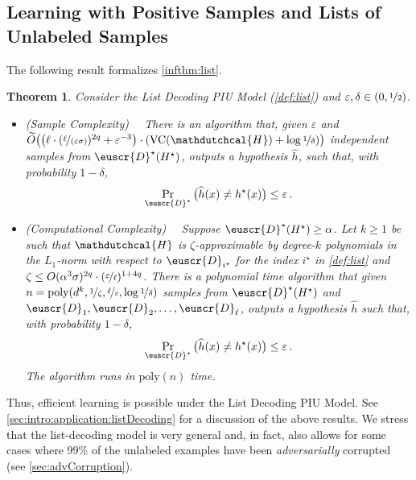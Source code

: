 \documentclass[11pt]{article}
\theoremstyle{plain}
\newtheorem{theorem}{Theorem}[section]
\theoremstyle{definition}
\theoremstyle{remark}
\newcommand{\sinparen}[1]{(#1)}
\newcommand{\binparen}[1]{\big(#1\big)}
\newcommand{\nfrac}[2]{\nicefrac{#1}{#2}}
\newcommand{\poly}{\mathrm{poly}}
\newcommand{\vc}{\textrm{\rm VC}}
\newcommand{\eps}{\varepsilon}
\newcommand{\wh}[1]{\widehat{#1}}
\renewcommand{\tilde}{\widetilde}
\newcommand{\customcal}[1]{\euscr{#1}}
\newcommand{\cD}{\customcal{D}}
\newcommand{\hypo}[1]{\mathdutchcal{#1}}
\newcommand{\hyH}{\hypo{H}}
\newcommand{\cDtrue}{\cD^\star}
\newcommand{\cDgiven}{\cD}
\renewcommand{\tilde}{\widetilde}
\newcommand{\nL}{L}
\begin{document}
        
         
        
    \subsection{Learning with Positive Samples and Lists of Unlabeled Samples}\label{sec:application:listDecoding}
        The following result formalizes \cref{infthm:list}.
        \begin{theorem}\label{thm:listDecoding}
            Consider the List Decoding PIU Model (\cref{def:list}) and $\eps,\delta\in (0,\nfrac{1}{2})$.
            \begin{itemize}
                \item[$\triangleright$] (Sample Complexity)~~ There is an algorithm that, given $\eps$ and 
                $\tilde{O}\binparen{\binparen{\ell\cdot \sinparen{\nfrac{\ell}{(\eps\sigma)}}^{2q} + {\eps^{-3}}}\cdot \sinparen{\vc{(\hyH)} + \log \nfrac{1}{\delta}}}$ independent samples from $\cDtrue(H^\star)$, outputs a hypothesis $\wh{h}$, such that, with probability $1-\delta$,
                \[
                    \Pr_{\cDtrue}\binparen{\wh{h}(x) \neq h^\star(x)} \leq \eps\,.
                \]
                \item[$\triangleright$] (Computational Complexity)~~ 
                    Suppose $\cDtrue(H^\star) \geq \alpha$. 
                    Let $k \geq 1$ be such that $\hyH$ is $\zeta$-approximable by degree-$k$ polynomials in the $\nL_1$-norm with respect to $\cDgiven_{i^\star}$ for the index $i^\star$ in \cref{def:list} and $\zeta\leq O\sinparen{{\alpha^3\sigma}{}}^{2q}\cdot \sinparen{\nfrac{\eps}{\ell}}^{1+4q}$.
                    There is a polynomial time algorithm that given $n=\poly(d^k, \nfrac{1}{\zeta}, \nfrac{\ell}{\eps}, \log \nfrac{1}{\delta})$ samples from $\cDtrue(H^\star)$ and $\cDgiven_1,\cDgiven_2,\dots,\cDgiven_\ell$, outputs a hypothesis $\wh{h}$ such that, with probability $1-\delta$,
                    \[
                        \Pr_{\cDtrue}\binparen{\wh{h}(x) \neq h^\star(x)} \leq \eps\,.
                    \]
                    The algorithm runs in $\poly(n)$ time.
            \end{itemize}
        \end{theorem} 
        Thus, efficient learning is possible under the List Decoding PIU Model.
        See \cref{sec:intro:application:listDecoding} for a discussion of the above results. %
        We stress that the list-decoding model is very general and, in fact, also allows for some cases where 99\% of the unlabeled examples have been \textit{adversarially} corrupted (see \cref{sec:advCorruption}).
\end{document}

